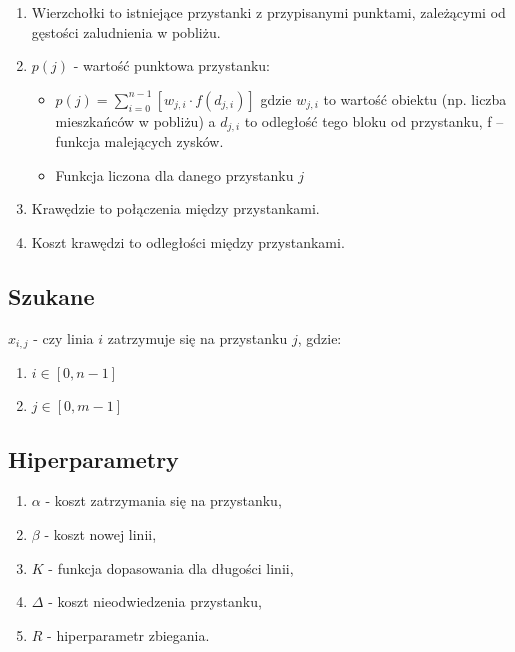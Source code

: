 \documentclass[12pt,a4paper,openright]{mwrep}
\begin{document}
\begin{enumerate}
    \item Wierzchołki to istniejące przystanki z przypisanymi punktami, zależącymi od gęstości zaludnienia w pobliżu.
    \item $p(j)$ - wartość punktowa przystanku:
          \begin{itemize}
              \item $p(j) = \sum_{i=0}^{n-1} \left[ w_{j, i} \cdot f(d_{j, i}) \right]$ gdzie $w_{j, i}$ to wartość obiektu (np. liczba mieszkańców w pobliżu) a $d_{j,i}$ to odległość tego bloku od przystanku, f – funkcja malejących zysków.
              \item Funkcja liczona dla danego przystanku $j$
          \end{itemize}
    \item Krawędzie to połączenia między przystankami.
    \item Koszt krawędzi to odległości między przystankami.
\end{enumerate}










\subsection{Szukane}
$x_{i,j}$ - czy linia $i$ zatrzymuje się na przystanku $j$, gdzie:
\begin{enumerate}
    \item $i \in \left[ 0, n-1 \right]$
    \item $j \in \left[ 0, m-1 \right]$
\end{enumerate}

\subsection{Hiperparametry}
\begin{enumerate}
    \item $\alpha$ - koszt zatrzymania się na przystanku,
    \item $\beta$ - koszt nowej linii,
    \item $K$ - funkcja dopasowania dla długości linii,
    \item $\Delta$ - koszt nieodwiedzenia przystanku,
    \item $R$ - hiperparametr zbiegania.
\end{enumerate}
\end{document}
